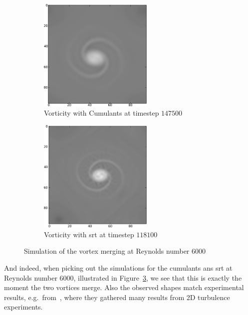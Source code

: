 \begin{figure}
    \medskip
    \begin{subfigure}[b]{.5\textwidth}
      \centering
      \includegraphics[width=0.6\textwidth]{../figures/cumulant_Re6000_size96_1475.png}  %
      \caption{Vorticity with Cumulants at timestep $147500$}
\label{fig: rankine cumulant}
    \end{subfigure}\begin{subfigure}[b]{.5\textwidth}
    \centering
    \includegraphics[width=0.6\textwidth]{../figures/srt_Re6000_size96_1181.png}  %
    \caption{Vorticity with \gls{srt} at timestep $118100$}
\label{fig: rankine srt}
  \end{subfigure}
  \caption{Simulation of the vortex merging at Reynolds number $6000$}
\label{fig: rankine 6000}
\end{figure}
And indeed, when picking out the simulations for the cumulants ans \gls{srt} at Reynolds number $6000$, illustrated in Figure~\ref{fig: rankine 6000}, we see that this is exactly the moment the two vortices merge.
Also the observed shapes match experimental results, e.g.\ from~\cite{tabeling2002two}, where they gathered many results from 2D turbulence experiments.
